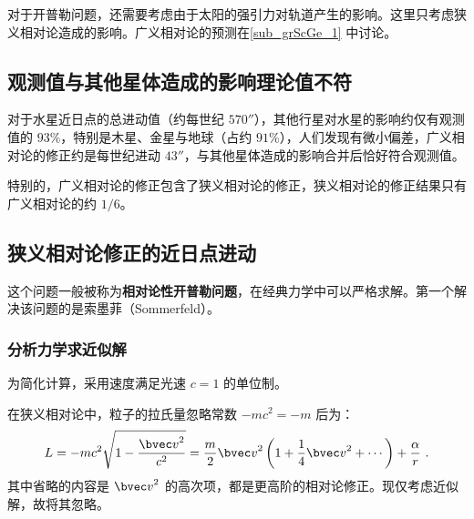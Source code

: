 



对于开普勒问题，还需要考虑由于太阳的强引力对轨道产生的影响。这里只考虑狭义相对论造成的影响。广义相对论的预测在\autoref{sub_grScGe_1} 中讨论。

\subsection{观测值与其他星体造成的影响理论值不符}
对于水星近日点的总进动值（约每世纪 $570''$），其他行星对水星的影响约仅有观测值的 $93 \%$，特别是木星、金星与地球（占约 $91\%$），人们发现有微小偏差，广义相对论的修正约是每世纪进动 $43''$，与其他星体造成的影响合并后恰好符合观测值。

特别的，广义相对论的修正包含了狭义相对论的修正，狭义相对论的修正结果只有广义相对论的约 $1/6$。

\subsection{狭义相对论修正的近日点进动}
这个问题一般被称为\textbf{相对论性开普勒问题}，在经典力学中可以严格求解。第一个解决该问题的是索墨菲（Sommerfeld）。

\subsubsection{分析力学求近似解}
为简化计算，采用速度满足光速 $c=1$ 的单位制。

在狭义相对论中，粒子的拉氏量忽略常数 $-mc^2 = -m$ 后为：
$$L = -mc^2 \sqrt{1- \frac{{\bvec v}^2}{c^2}} = \frac{m}{2} {\bvec v}^2 \left( 1+\frac{1}{4} {\bvec v}^2 + \cdots \right) + \frac{\alpha}{r} ~.$$
其中省略的内容是 ${\bvec v}^2$ 的高次项，都是更高阶的相对论修正。现仅考虑近似解，故将其忽略。

